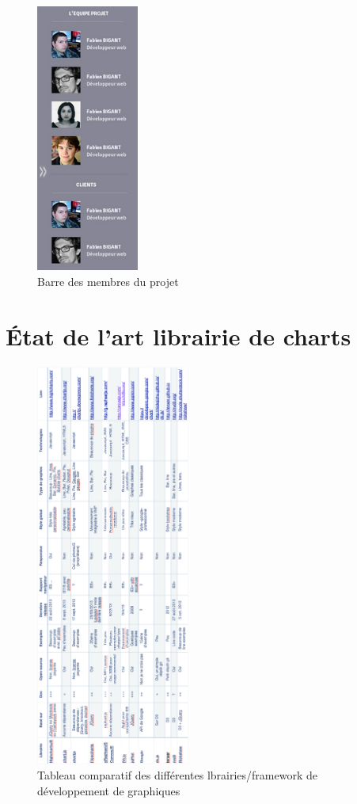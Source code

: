 \documentclass[12pt]{report}
\begin{document}
\begin{appendices}
\begin{figure}[H]
	\centering
	\includegraphics[width=0.3\textwidth]{pictures/maquetteVersusmind/barreMembres.jpg}
	\caption{Barre des membres du projet}
	\label{16}
\end{figure}
	
	\chapter{État de l'art librairie de charts}
	
	\begin{figure}[!h]
	\centering
	\includegraphics[width=0.45\textwidth]{pictures/comparatifcharts.png}
	\caption{Tableau comparatif des différentes lbrairies/framework de développement de graphiques}
	\label{a4}
\end{figure}
	

\end{appendices}
\end{document}
